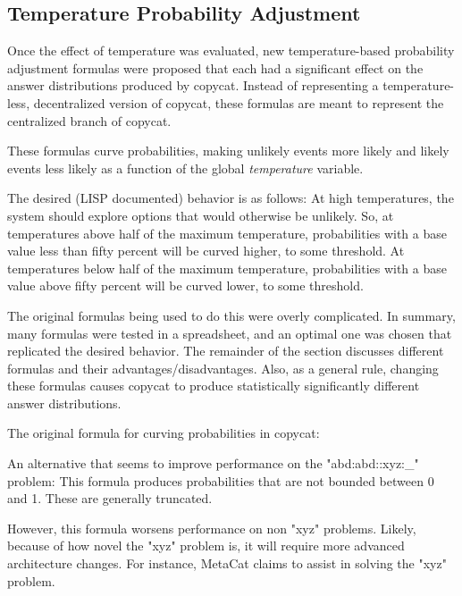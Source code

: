 \documentclass[a4paper]{article}
\begin{document}
    \subsection{Temperature Probability Adjustment}

        Once the effect of temperature was evaluated, new temperature-based probability adjustment formulas were proposed that each had a significant effect on the answer distributions produced by copycat.
        Instead of representing a temperature-less, decentralized version of copycat, these formulas are meant to represent the centralized branch of copycat.

        These formulas curve probabilities, making unlikely events more likely and likely events less likely as a function of the global \emph{temperature} variable.

        The desired (LISP documented) behavior is as follows:
        At high temperatures, the system should explore options that would otherwise be unlikely.
        So, at temperatures above half of the maximum temperature, probabilities with a base value less than fifty percent will be curved higher, to some threshold.
        At temperatures below half of the maximum temperature, probabilities with a base value above fifty percent will be curved lower, to some threshold.

        The original formulas being used to do this were overly complicated.
        In summary, many formulas were tested in a spreadsheet, and an optimal one was chosen that replicated the desired behavior.
        The remainder of the section discusses different formulas and their advantages/disadvantages.
        Also, as a general rule, changing these formulas causes copycat to produce statistically significantly different answer distributions.

        The original formula for curving probabilities in copycat:
        

        An alternative that seems to improve performance on the "abd:abd::xyz:\_" problem:
        This formula produces probabilities that are not bounded between 0 and 1. These are generally truncated.
        

        However, this formula worsens performance on non "xyz" problems.
        Likely, because of how novel the "xyz" problem is, it will require more advanced architecture changes.
        For instance, MetaCat claims to assist in solving the "xyz" problem.
\end{document}
